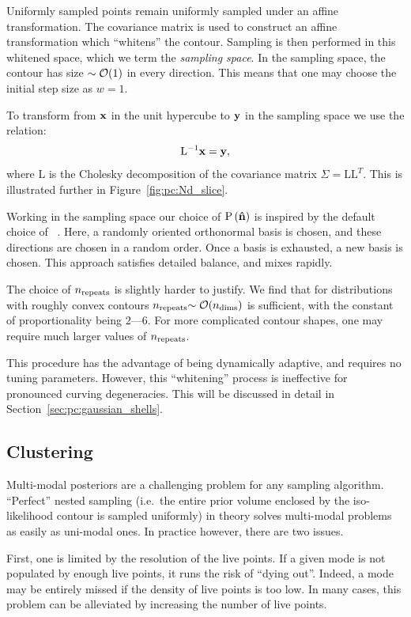 Uniformly sampled points remain uniformly sampled under an affine transformation. The covariance matrix is used to construct an affine transformation which ``whitens'' the contour. Sampling is then performed in this whitened space, which we term the {\em sampling space}.
In the sampling space, the contour has size ${\sim\mathcal{O}{\left(1\right)}}$ in every direction. This means that one may choose the initial step size as $w=1$.

To transform from $\mathbf{x}$ in the unit hypercube to $\mathbf{y}$ in the sampling space we use the relation:
\begin{equation}
  \mathrm{L}^{-1}\mathbf{x} =  \mathbf{y},
  \label{eqn:pc:cholesky}
\end{equation}
where $\mathrm{L}$ is the Cholesky decomposition of the covariance matrix $\Sigma = \mathrm{L} \mathrm{L}^{T}$.
This is illustrated further in Figure~\ref{fig:pc:Nd_slice}.

Working in the sampling space our choice of $\mathrm{P}\left(\mathbf{\hat{n}}\right)$ is inspired by the default choice of \CosmoMC{}~\citep{LewisFastSlow}. Here, a randomly oriented orthonormal basis is chosen, and these directions are chosen in a random order. Once a basis is exhausted, a new basis is chosen. This approach satisfies detailed balance, and mixes rapidly.

The choice of $n_{\mathrm{repeats}}$ is slightly harder to justify. We find that for distributions with roughly convex contours $n_{\mathrm{repeats}}{\sim\mathcal{O}{\left(n_{\mathrm{dims}}\right)}}$ is sufficient, with the constant of proportionality being $2$---$6$. For more complicated contour shapes, one may require much larger values of $n_{\mathrm{repeats}}$. 

This procedure has the advantage of being dynamically adaptive, and requires no tuning parameters. However, this ``whitening'' process is ineffective for pronounced curving degeneracies. This will be discussed in detail in Section~\ref{sec:pc:gaussian_shells}.


\subsection{Clustering}
\label{sec:pc:clustering}
Multi-modal posteriors are a challenging problem for any sampling algorithm. ``Perfect'' nested sampling (i.e.\ the entire prior volume enclosed by the iso-likelihood contour is sampled uniformly) in theory solves multi-modal problems as easily as uni-modal ones. In practice however, there are two issues.

First, one is limited by the resolution of the live points. If a given mode is not populated by enough live points, it runs the risk of ``dying out''. Indeed, a mode may be entirely missed if the density of live points is too low. In many cases, this problem can be alleviated by increasing the number of live points.

